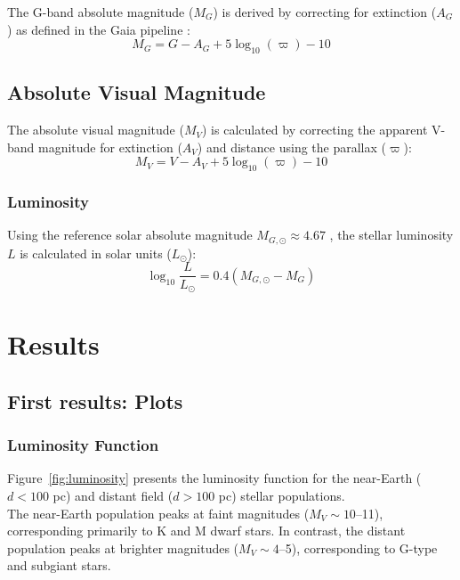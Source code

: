\documentclass[11pt]{article}
\begin{document}
The G-band absolute magnitude ($M_G$) is derived by correcting for extinction ($A_G$) as defined in the Gaia pipeline \cite{GaiaData}:
\begin{equation}
    M_{G} = G - A_{G} + 5 \log_{10}(\varpi) - 10
\end{equation}
\subsection{Absolute Visual Magnitude}
The absolute visual magnitude ($M_V$) is calculated by correcting the apparent V-band magnitude for extinction ($A_V$) and distance using the parallax ($\varpi$):
\begin{equation}
    M_{V} = V - A_{V} + 5 \log_{10}(\varpi) - 10
\end{equation}

\subsubsection{Luminosity}
Using the reference solar absolute magnitude $M_{G,\odot} \approx 4.67$ \cite{Casagrande2018}, the stellar luminosity $L$ is calculated in solar units ($L_{\odot}$)\cite{IAU2015}:
\begin{equation}
    \log_{10} \frac{L}{L_{\odot}} = 0.4(M_{G,\odot} - M_{G})
\end{equation}

\section{Results}

\subsection{First results: Plots}
\subsubsection{ Luminosity Function}

Figure~\ref{fig:luminosity} presents the luminosity function for the near-Earth ($d < 100$ pc) and distant field ($d > 100$ pc) stellar populations.\\

\noindent The near-Earth population peaks at faint magnitudes ($M_V \sim 10$--11), corresponding primarily to K and M dwarf stars. In contrast, the distant population peaks at brighter magnitudes ($M_V \sim 4$--5), corresponding to G-type and subgiant stars.\\
\end{document}
